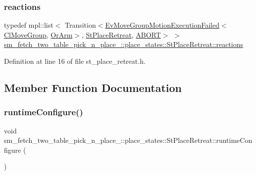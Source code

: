 \subsubsection{\texorpdfstring{reactions}{reactions}}
{\footnotesize\ttfamily typedef mpl\+::list$<$ Transition$<$\hyperlink{structcl__move__group__interface_1_1EvMoveGroupMotionExecutionFailed}{Ev\+Move\+Group\+Motion\+Execution\+Failed}$<$\hyperlink{classcl__move__group__interface_1_1ClMoveGroup}{Cl\+Move\+Group}, \hyperlink{classsm__fetch__two__table__pick__n__place__1_1_1OrArm}{Or\+Arm}$>$, \hyperlink{structsm__fetch__two__table__pick__n__place__1_1_1place__states_1_1StPlaceRetreat}{St\+Place\+Retreat}, \hyperlink{classABORT}{A\+B\+O\+RT}$>$ $>$ \hyperlink{structsm__fetch__two__table__pick__n__place__1_1_1place__states_1_1StPlaceRetreat_a5848487ad7dae4dd59dde554eb9b1e85}{sm\+\_\+fetch\+\_\+two\+\_\+table\+\_\+pick\+\_\+n\+\_\+place\+\_\+::place\+\_\+states\+::\+St\+Place\+Retreat\+::reactions}}



Definition at line 16 of file st\+\_\+place\+\_\+retreat.\+h.



\subsection{Member Function Documentation}
\mbox{\label{structsm__fetch__two__table__pick__n__place__1_1_1place__states_1_1StPlaceRetreat_a4dcdef9108767df1d19da62b5e186a47}} 
\subsubsection{\texorpdfstring{runtime\+Configure()}{runtimeConfigure()}}
{\footnotesize\ttfamily void sm\+\_\+fetch\+\_\+two\+\_\+table\+\_\+pick\+\_\+n\+\_\+place\+\_\+::place\+\_\+states\+::\+St\+Place\+Retreat\+::runtime\+Configure (\begin{DoxyParamCaption}{ }\end{DoxyParamCaption})\hspace{0.3cm}{\ttfamily [inline]}}



